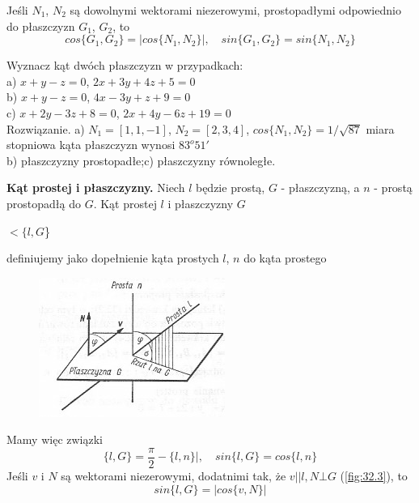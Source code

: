 Jeśli $N_1$, $N_2$ są dowolnymi wektorami niezerowymi, prostopadłymi odpowiednio do płaszczyzn $G_1$, $G_2$, to
\begin{equation}
	cos \{G_1, G_2\} = |cos \{N_1, N_2\}|, \quad sin \{G_1, G_2\} = sin \{N_1, N_2\}  \nonumber
\end{equation}

\begin{przyklad}{32.5}
Wyznacz kąt dwóch płaszczyzn w przypadkach:\\
a) $x+y-z=0$, \quad $2x+3y+4z+5=0$\\
b) $x+y-z=0$, \quad $4x-3y+z+9=0$\\
c) $x+2y-3z+8=0$, \quad $2x+4y-6z+19=0$\\
Rozwiązanie. a) $N_1=[1,1,-1]$, $N_2=[2,3,4]$, $cos\{N_1, N_2\}=1/\sqrt{87}$ miara stopniowa kąta płaszczyzn wynosi $83^o51'$\\
b) płaszczyzny prostopadłe;\quad c) płaszczyzny równoległe.
\end{przyklad}
\textbf{Kąt prostej i płaszczyzny.} Niech $l$ będzie prostą, $G$ - płaszczyzną, a $n$ - prostą prostopadłą do $G$. Kąt prostej $l$ i płaszczyzny $G$
\begin{center}
$< \{l, G$\}
\end{center}
definiujemy jako dopełnienie kąta prostych $l$, $n$ do kąta prostego

\begin{figure}[ht]
	\centering
		\includegraphics{rys/32_3.png}
	\caption{ }
	\label{fig:31.3}
\end{figure}

Mamy więc związki
\begin{equation}
	\{l, G\} = \frac{\pi}{2} - \{l, n\}|, \quad sin \{l, G\} = cos \{l, n\}  \nonumber
\end{equation}
Jeśli $v$ i $N$ są wektorami niezerowymi, dodatnimi tak, że $v||l, N \bot G$ (\ref{fig:32.3}), to
\begin{equation}
sin \{l,G\} = |cos\{v,N\}|
\end{equation}

